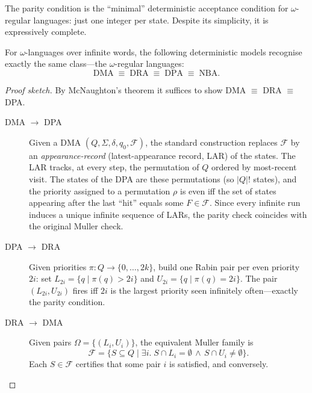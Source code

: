 The parity condition is the ``minimal'' deterministic acceptance condition for $\omega$-regular languages: just one integer per state. Despite its simplicity, it is expressively complete.

\begin{theorem}
\label{thm:det-equiv}
For $\omega$-languages over infinite words, the following deterministic models recognise exactly the same class---the $\omega$-regular languages:
$$\text{DMA} \;\equiv\; \text{DRA} \;\equiv\; \text{DPA} \;\equiv\; \text{NBA}.$$
\end{theorem}

\begin{proof}[Proof sketch]
By McNaughton's theorem it suffices to show DMA $\equiv$ DRA $\equiv$ DPA.

\begin{description}
    \item[DMA $\to$ DPA] Given a DMA $(Q, \Sigma, \delta, q_0, \mathcal{F})$, the standard construction replaces $\mathcal{F}$ by an \emph{appearance-record} (latest-appearance record, LAR) of the states. The LAR tracks, at every step, the permutation of $Q$ ordered by most-recent visit. The states of the DPA are these permutations (so $|Q|!$ states), and the priority assigned to a permutation $\rho$ is even iff the set of states appearing after the last ``hit'' equals some $F \in \mathcal{F}$. Since every infinite run induces a unique infinite sequence of LARs, the parity check coincides with the original Muller check.

    \item[DPA $\to$ DRA] Given priorities $\pi : Q \to \{0, \dots, 2k\}$, build one Rabin pair per even priority $2i$: set $L_{2i} = \{q \mid \pi(q) > 2i\}$ and $U_{2i} = \{q \mid \pi(q) = 2i\}$. The pair $(L_{2i}, U_{2i})$ fires iff $2i$ is the largest priority seen infinitely often---exactly the parity condition.

    \item[DRA $\to$ DMA] Given pairs $\Omega = \{(L_i, U_i)\}$, the equivalent Muller family is
$$\mathcal{F} = \{S \subseteq Q \mid \exists i.\; S \cap L_i = \emptyset \,\land\, S \cap U_i \neq \emptyset\}.$$
Each $S \in \mathcal{F}$ certifies that some pair $i$ is satisfied, and conversely.
\end{description}
\end{proof}


